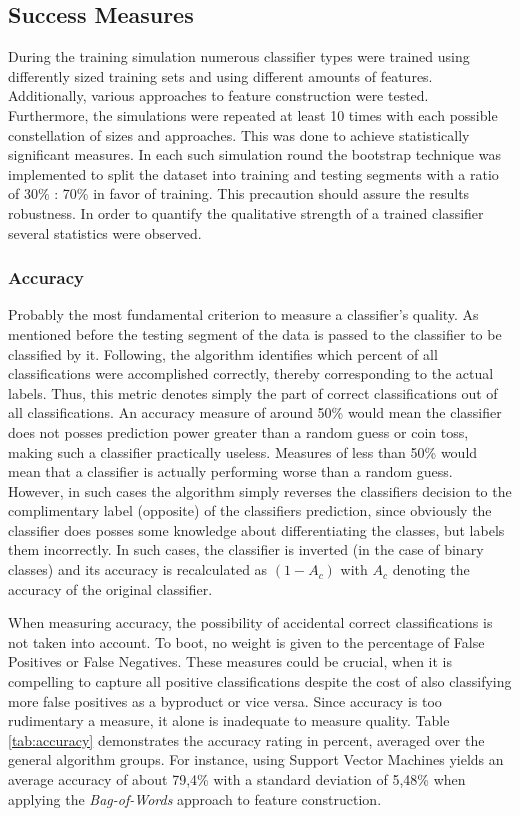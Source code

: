 	\subsection{Success Measures}
		\label{accuracy}
		During the training simulation numerous classifier types were trained using differently sized training sets and using different amounts of features. Additionally, various approaches to feature construction were tested. Furthermore, the simulations were repeated at least 10 times with each possible constellation of sizes and approaches. This was done to achieve statistically significant measures. In each such simulation round the bootstrap technique was implemented to split the dataset into training and testing segments with a ratio of 30\% : 70\% in favor of training. This precaution should assure the results robustness. In order to quantify the qualitative strength of a trained classifier several statistics were observed.
		
		\par
	
		\subsubsection{Accuracy}
			Probably the most fundamental criterion to measure a classifier's quality. As mentioned before the testing segment of the data is passed to the classifier to be classified by it. Following, the algorithm identifies which percent of all classifications were accomplished correctly, thereby corresponding to the actual labels. Thus, this metric denotes simply the part of correct classifications out of all classifications. An accuracy measure of around 50\% would mean the classifier does not posses prediction power greater than a random guess or coin toss, making such a classifier practically useless. Measures of less than 50\% would mean that a classifier is actually performing worse than a random guess. However, in such cases the algorithm simply reverses the classifiers decision to the complimentary label (opposite) of the classifiers prediction, since obviously the classifier does posses some knowledge about differentiating the classes, but labels them incorrectly. In such cases, the classifier is inverted (in the case of binary classes) and its accuracy is recalculated as $ (1-A_c) $ with $ A_c $ denoting the accuracy of the original classifier. 
			
			\par
			When measuring accuracy, the possibility of accidental correct classifications is not taken into account. To boot, no weight is given to the percentage of False Positives or False Negatives. These measures could be crucial, when it is compelling to capture all positive classifications despite the cost of also classifying more false positives as a byproduct or vice versa. Since accuracy is too rudimentary a measure, it alone is inadequate to measure quality. Table \ref{tab:accuracy} demonstrates the accuracy rating in percent, averaged over the general algorithm groups. For instance, using Support Vector Machines yields an average accuracy of about 79,4\% with a standard deviation of 5,48\% when applying the \textit{Bag-of-Words} approach to feature construction.
			
